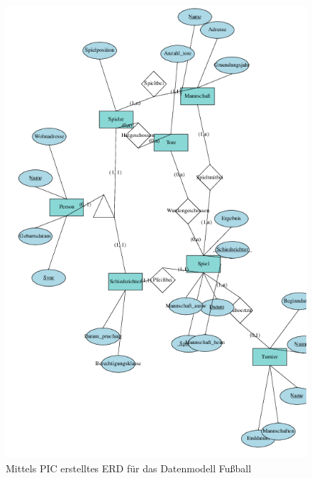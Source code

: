 \begin{figure}[H]
	\begin{center}
		\includegraphics{images/fussball-erd.png}
		\caption{Mittels PIC erstelltes ERD für das Datenmodell Fußball}
		\label{erd-pic}
	\end{center}
\end{figure}
\pra
